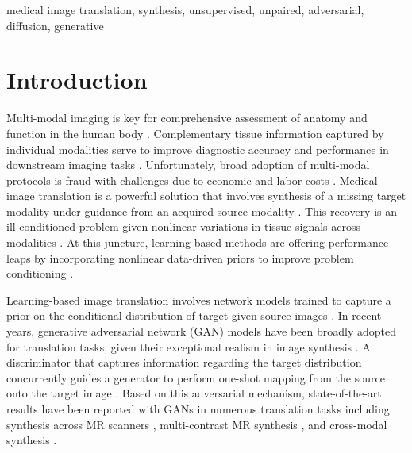 \documentclass[journal,twoside,web]{ieeecolor}
\begin{document}
\begin{IEEEkeywords}
medical image translation, synthesis, unsupervised, unpaired, adversarial, diffusion, generative  \vspace{-0.25cm}
\end{IEEEkeywords}

\section{Introduction}
Multi-modal imaging is key for comprehensive assessment of anatomy and function in the human body \cite{iglesias2013}. Complementary tissue information captured by individual modalities serve to improve diagnostic accuracy and performance in downstream imaging tasks \cite{lee2017}. Unfortunately, broad adoption of multi-modal protocols is fraud with challenges due to economic and labor costs \cite{ye2013,huynh2015,jog2017,joyce2017}. Medical image translation is a powerful solution that involves synthesis of a missing target modality under guidance from an acquired source modality \cite{cordier2016,wu2016,zhao2017,huang2018}. This recovery is an ill-conditioned problem given nonlinear variations in tissue signals across modalities \cite{roy2013,alexander2014,huang2017}. At this juncture, learning-based methods are offering performance leaps by incorporating nonlinear data-driven priors to improve problem conditioning \cite{hien2015,vemulapalli2015,sevetlidis2016,nie2016}.

Learning-based image translation involves network models trained to capture a prior on the conditional distribution of target given source images \cite{bowles2016,chartsias2018,wei2019}. In recent years, generative adversarial network (GAN) models have been broadly adopted for translation tasks, given their exceptional realism in image synthesis \cite{dar2019image,yu2018,nie2018,armanious2019,lee2019,li2019}. A discriminator that captures information regarding the target distribution concurrently guides a generator to perform one-shot mapping from the source onto the target image \cite{yu2019,mmgan,wang2020,zhou2020,lan2020}. Based on this adversarial mechanism, state-of-the-art results have been reported with GANs in numerous translation tasks including synthesis across MR scanners \cite{nie2018}, multi-contrast MR synthesis \cite{dar2019image,lee2019,yu2019,yurt2021mustgan}, and cross-modal synthesis \cite{yang2018,jin2018,resvit}.    
\end{document}
